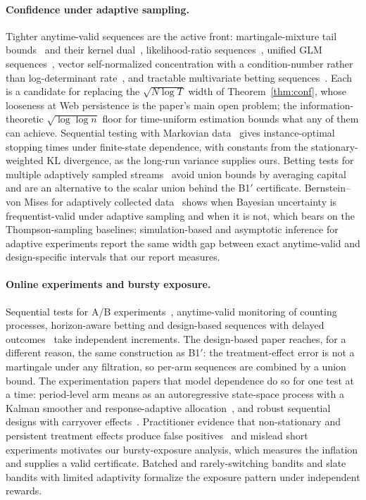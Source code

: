 \documentclass[sigconf,review,anonymous]{acmart}
\begin{document}
\paragraph{Confidence under adaptive sampling.} Tighter anytime-valid sequences are the active front: martingale-mixture tail bounds~\cite{flynn2023martingale} and their kernel dual~\cite{flynn2025kernel}, likelihood-ratio sequences~\cite{emmenegger2023lr}, unified GLM sequences~\cite{lee2024glmcs}, vector self-normalized concentration with a condition-number rather than log-determinant rate~\cite{whitehouse2025vector}, and tractable multivariate betting sequences~\cite{denoodt2026multivariate}. Each is a candidate for replacing the $\sqrt{N\log T}$ width of Theorem~\ref{thm:conf}, whose looseness at Web persistence is the paper's main open problem; the information-theoretic $\sqrt{\log\log n}$ floor for time-uniform estimation bounds what any of them can achieve. Sequential testing with Markovian data~\cite{sethi2026markovian} gives instance-optimal stopping times under finite-state dependence, with constants from the stationary-weighted KL divergence, as the long-run variance supplies ours. Betting tests for multiple adaptively sampled streams~\cite{cho2024peak} avoid union bounds by averaging capital and are an alternative to the scalar union behind the B1$'$ certificate. Bernstein--von Mises for adaptively collected data~\cite{du2025bvm} shows when Bayesian uncertainty is frequentist-valid under adaptive sampling and when it is not, which bears on the Thompson-sampling baselines; simulation-based and asymptotic inference for adaptive experiments report the same width gap between exact anytime-valid and design-specific intervals that our report measures.

\paragraph{Online experiments and bursty exposure.} Sequential tests for A/B experiments~\cite{kurennoy2025yeast}, anytime-valid monitoring of counting processes, horizon-aware betting and design-based sequences with delayed outcomes~\cite{lindon2026delayed} take independent increments. The design-based paper reaches, for a different reason, the same construction as B1$'$: the treatment-effect error is not a martingale under any filtration, so per-arm sequences are combined by a union bound. The experimentation papers that model dependence do so for one test at a time: period-level arm means as an autoregressive state-space process with a Kalman smoother and response-adaptive allocation~\cite{shao2026statespace}, and robust sequential designs with carryover effects~\cite{wen2026robust}. Practitioner evidence that non-stationary and persistent treatment effects produce false positives~\cite{kohavi2024false} and mislead short experiments motivates our bursty-exposure analysis, which measures the inflation and supplies a valid certificate. Batched and rarely-switching bandits and slate bandits with limited adaptivity formalize the exposure pattern under independent rewards.
\end{document}
